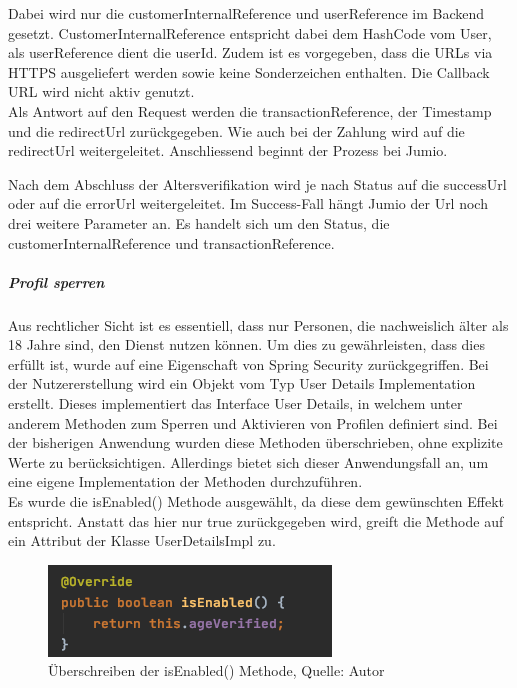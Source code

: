 Dabei wird nur die \glqq customerInternalReference\grqq{} und \glqq userReference\grqq{} im Backend gesetzt. CustomerInternalReference entspricht dabei dem HashCode vom User, als userReference dient die userId. Zudem ist es vorgegeben, dass die \ac{URL}s via \ac{HTTPS} ausgeliefert werden sowie keine Sonderzeichen enthalten. Die Callback URL wird nicht aktiv genutzt. \\

Als Antwort auf den Request werden die transactionReference, der Timestamp und die redirectUrl zurückgegeben. Wie auch bei der Zahlung wird auf die redirectUrl weitergeleitet. Anschliessend beginnt der Prozess bei Jumio.

Nach dem Abschluss der Altersverifikation wird je nach Status auf die successUrl oder auf die errorUrl weitergeleitet. Im Success-Fall hängt Jumio der Url noch drei weitere Parameter an. Es handelt sich um den Status, die customerInternalReference und transactionReference. \\

\subparagraph{Profil sperren}
Aus rechtlicher Sicht ist es essentiell, dass nur Personen, die nachweislich älter als 18 Jahre sind, den Dienst nutzen können. Um dies zu gewährleisten, dass dies erfüllt ist, wurde auf eine Eigenschaft von Spring Security zurückgegriffen. Bei der Nutzererstellung wird ein Objekt vom Typ User Details Implementation erstellt. Dieses implementiert das Interface User Details, in welchem unter anderem Methoden zum Sperren und Aktivieren von Profilen definiert sind. Bei der bisherigen Anwendung wurden diese Methoden überschrieben, ohne explizite Werte zu berücksichtigen. Allerdings bietet sich dieser Anwendungsfall an, um eine eigene Implementation der Methoden durchzuführen. \\
Es wurde die \glqq isEnabled()\grqq{} Methode ausgewählt, da diese dem gewünschten Effekt entspricht. Anstatt das hier nur true zurückgegeben wird, greift die Methode auf ein Attribut der Klasse UserDetailsImpl zu. 
 \begin{figure}[H]
	\centering
	\includegraphics[scale=0.6]{images/methodIsEnabled.PNG}
	\caption[Überschreiben der isEnabled() Methode]{Überschreiben der isEnabled() Methode, Quelle: Autor}
	\label{img: methodIsEnabled}
\end{figure} 

